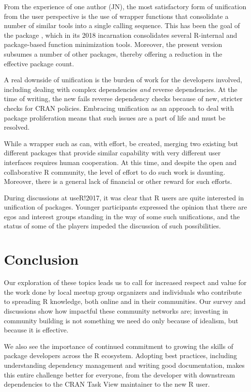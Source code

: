 From the experience of one author (JN), the most satisfactory form of
unification from the user perspective is the use of wrapper functions
that consolidate a number of similar tools into a single calling
sequence. This has been the goal of the package , which
in its 2018 incarnation consolidates several R-internal and
package-based function minimization tools. Moreover, the present version
subsumes a number of other packages, thereby offering a reduction in the
effective package count.

A real downside of unification is the burden of work for the developers
involved, including dealing with complex dependencies \emph{and} reverse
dependencies. At the time of writing, the new  fails
reverse dependency checks because of new, stricter checks for CRAN
policies. Embracing unification as an approach to deal with package
proliferation means that such issues are a part of life and must be
resolved.

While a wrapper such as  can, with effort, be created,
merging two existing but different packages that provide similar
capability with very different user interfaces requires human
cooperation. At this time, and despite the open and collaborative R
community, the level of effort to do such work is daunting. Moreover,
there is a general lack of financial or other reward for such efforts.

During discussions at useR!2017, it was clear that R users are quite
interested in unification of packages. Younger participants expressed
the opinion that there are egos and interest groups standing in the way
of some such unifications, and the status of some of the players impeded
the discussion of such possibilities.

\hypertarget{conclusion}{%
\section{Conclusion}\label{conclusion}}

Our exploration of these topics leads us to call for increased respect
and value for the work done by local meetup group organizers and
individuals who contribute to spreading R knowledge, both online and in
their communities. Our survey and discussions show how impactful these
community networks are; investing in community building is not something
we need do only because of idealism, but because it is effective.

We also see the importance of continued commitment to growing the skills
of package developers across the R ecosystem. Adopting best practices,
including understanding dependency management and writing good
documentation, makes this entire challenge better for everyone, from the
developer with downstream dependencies to the CRAN Task View maintainer
to the new R user.

